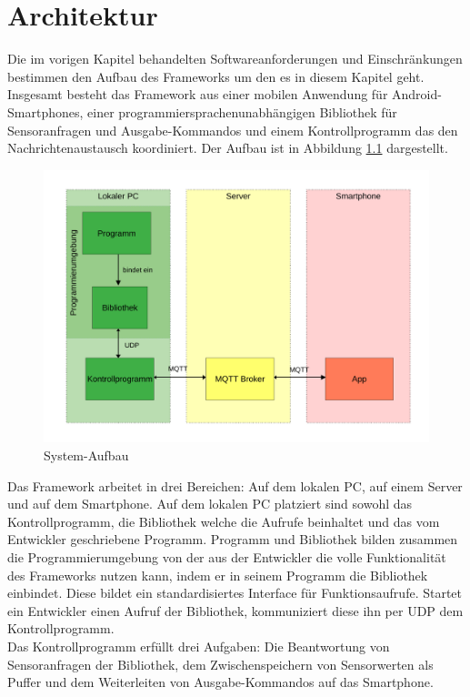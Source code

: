 \documentclass[11pt,a4paper]{report}
\begin{document}
\chapter{Architektur} \label{chap:architektur}
Die im vorigen Kapitel behandelten Softwareanforderungen und Einschränkungen bestimmen den Aufbau des Frameworks um den es in diesem Kapitel geht.
Insgesamt besteht das Framework aus einer mobilen Anwendung für Android-Smartphones, einer programmiersprachenunabhängigen Bibliothek für Sensoranfragen und Ausgabe-Kommandos und einem Kontrollprogramm das den Nachrichtenaustausch koordiniert.
Der Aufbau ist in Abbildung \ref{fig:design} dargestellt.
\begin{figure}[htbp]
\centering
\includegraphics[width=\textwidth]{images/framework.pdf}
\caption{System-Aufbau}
\label{fig:design}
\end{figure}
Das Framework arbeitet in drei Bereichen: Auf dem lokalen PC, auf einem Server und auf dem Smartphone.
Auf dem lokalen PC platziert sind sowohl das Kontrollprogramm, die Bibliothek welche die Aufrufe beinhaltet und das vom Entwickler geschriebene Programm.
Programm und Bibliothek bilden zusammen die Programmierumgebung von der aus der Entwickler die volle Funktionalität des Frameworks nutzen kann, indem er in seinem Programm die Bibliothek einbindet.
Diese bildet ein standardisiertes Interface für Funktionsaufrufe.
Startet ein Entwickler einen Aufruf der Bibliothek, kommuniziert diese ihn per UDP dem Kontrollprogramm.
\\
Das Kontrollprogramm erfüllt drei Aufgaben: Die Beantwortung von Sensoranfragen der Bibliothek, dem Zwischenspeichern von Sensorwerten als Puffer und dem Weiterleiten von Ausgabe-Kommandos auf das Smartphone.
\end{document}

